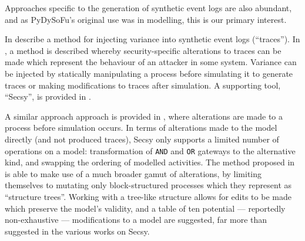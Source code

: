 Approaches specific to the generation of synthetic event logs are also
abundant\cite{stocker2013secsy, pourmasoumi2015business, Loreti_2019,
Yousfi_2015, ExecutableBPMNMitsyuk}, and as PyDySoFu's original use was in
\sociotechnical modelling, this is our primary interest. 




In \cite{stocker2013secsy, stocker2014secsy} \citeauthor{stocker2013secsy}
describe a method for injecting variance into synthetic event logs (``traces'').
In \cite{stocker2013secsy}, a method is described whereby security-specific
alterations to traces can be made which represent the behaviour of an attacker
in some \sociotechnical system. Variance can be injected by statically
manipulating a process before simulating it to generate traces or making
modifications to traces after simulation. A supporting tool, ``Secsy'', is
provided in \cite{stocker2014secsy}.

A similar approach approach is provided in \cite{pourmasoumi2015business}, where
alterations are made to a process before simulation occurs. In terms of
alterations made to the model directly (and not produced traces), Secsy only
supports a limited number of operations on a model: transformation of
\texttt{AND} and \texttt{OR} gateways to the alternative kind, and swapping the
ordering of modelled activities. The method proposed in
\cite{pourmasoumi2015business} is able to make use of a much broader gamut of
alterations, by limiting themselves to mutating only block-structured processes
which they represent as ``structure trees''. Working with a tree-like structure
allows for edits to be made which preserve the model's validity, and a table of
ten potential --- reportedly non-exhaustive --- modifications to a model are
suggested, far more than suggested in the various works on Secsy.


